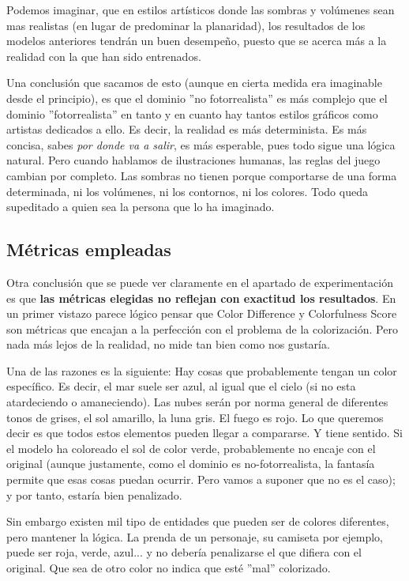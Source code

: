 \documentclass[a4paper]{article}
\begin{document}
Podemos imaginar, que en estilos artísticos donde las sombras y volúmenes sean mas realistas (en lugar de predominar la planaridad), los resultados de los modelos anteriores tendrán un buen desempeño, puesto que se acerca más a la realidad con la que han sido entrenados.

\medskip
Una conclusión que sacamos de esto (aunque en cierta medida era imaginable desde el principio), es que el dominio ''no fotorrealista'' es más complejo que el dominio ''fotorrealista'' en tanto y en cuanto hay tantos estilos gráficos como artistas dedicados a ello. Es decir, la realidad es más determinista. Es más concisa, sabes \textit{por donde va a salir}, es más esperable, pues todo sigue una lógica natural. Pero cuando hablamos de ilustraciones humanas, las reglas del juego cambian por completo. Las sombras no tienen porque comportarse de una forma determinada, ni los volúmenes, ni los contornos, ni los colores. Todo queda supeditado a quien sea la persona que lo ha imaginado.

\subsection{Métricas empleadas}

Otra conclusión que se puede ver claramente en el apartado de experimentación es que \textbf{las métricas elegidas no reflejan con exactitud los resultados}. 
En un primer vistazo parece lógico pensar que Color Difference y Colorfulness Score son métricas que encajan a la perfección con el problema de la colorización. Pero nada más lejos de la realidad, no mide tan bien como nos gustaría. 

Una de las razones es la siguiente: Hay cosas que probablemente tengan un color específico. Es decir, el mar suele ser azul, al igual que el cielo (si no esta atardeciendo o amaneciendo). Las nubes serán por norma general de diferentes tonos de grises, el sol amarillo, la luna gris. El fuego es rojo. 
Lo que queremos decir es que todos estos elementos pueden llegar a compararse. Y tiene sentido. Si el modelo ha coloreado el sol de color verde, probablemente no encaje con el original (aunque justamente, como el dominio es no-fotorrealista, la fantasía permite que esas cosas puedan ocurrir. Pero vamos a suponer que no es el caso); y por tanto, estaría bien penalizado. 

Sin embargo existen mil tipo de entidades que pueden ser de colores diferentes, pero mantener la lógica. La prenda de un personaje, su camiseta por ejemplo, puede ser roja, verde, azul... y no debería penalizarse el que difiera con el original. Que sea de otro color no indica que esté ''mal'' colorizado. 
\end{document}
